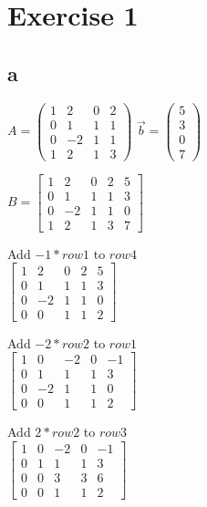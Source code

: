\documentclass{article}
\begin{document}
\section*{Exercise 1}

\subsection*{a}
$A=
\left (
    \begin{matrix}
        1 & 2 & 0 & 2\\
        0 & 1 & 1 & 1\\
        0 & -2 & 1 & 1\\
        1 & 2 & 1 & 3
    \end{matrix}
\right )
$
 $\vec{b}=
\left (
    \begin{matrix}
        5\\
        3\\
        0\\
        7
    \end{matrix}
\right )
$

$B=
\left [
        \begin{matrix}
            1 & 2 & 0 & 2 & 5\\
            0 & 1 & 1 & 1 & 3\\
            0 & -2 & 1 & 1 & 0\\
            1 & 2 & 1 & 3 & 7
        \end{matrix}
\right ]
$

Add $-1*row1$ to $row4$\\
$
\left [
        \begin{matrix}
            1 & 2 & 0 & 2 & 5\\
            0 & 1 & 1 & 1 & 3\\
            0 & -2 & 1 & 1 & 0\\
            0 & 0 & 1 & 1 & 2
        \end{matrix}
\right ]
$

Add $-2*row2$ to $row1$\\
$
\left [
        \begin{matrix}
            1 & 0 & -2 & 0 & -1\\
            0 & 1 & 1 & 1 & 3\\
            0 & -2 & 1 & 1 & 0\\
            0 & 0 & 1 & 1 & 2
        \end{matrix}
\right ]
$

Add $2*row2$ to $row3$\\
$
\left [
        \begin{matrix}
            1 & 0 & -2 & 0 & -1\\
            0 & 1 & 1 & 1 & 3\\
            0 & 0 & 3 & 3 & 6\\
            0 & 0 & 1 & 1 & 2
        \end{matrix}
\right ]
$
\end{document}
